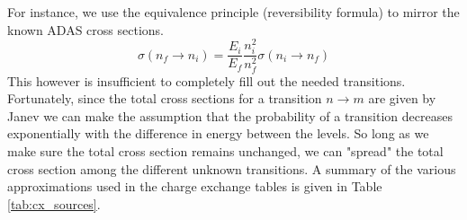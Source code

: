 For instance, we use the equivalence principle (reversibility formula) to mirror the known ADAS cross sections.
\begin{equation}\label{eq:equilvalence}
    \sigma(n_f \rightarrow n_i) = \frac{E_i}{E_f}\frac{n_i^2}{n_f^2}\sigma(n_i \rightarrow n_f)
\end{equation}
This however is insufficient to completely fill out the needed transitions.
Fortunately, since the total cross sections for a transition $n \rightarrow m$ are given by Janev\cite{janev2003collision} we can make the assumption that the probability of a transition decreases exponentially with the difference in energy between the levels. So long as we make sure the total cross section remains unchanged, we can "spread" the total cross section among the different unknown transitions.
A summary of the various approximations used in the charge exchange tables is given in Table \ref{tab:cx_sources}.
